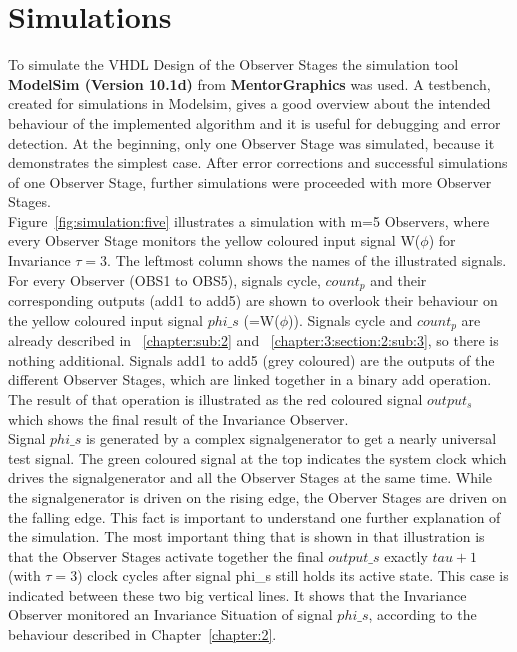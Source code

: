 \section{Simulations}
\label{chapter:4:section:2}
To simulate the VHDL Design of the Observer Stages the simulation tool \textbf{ModelSim (Version 10.1d)} from \textbf{MentorGraphics} was used. 
A testbench, created for simulations in Modelsim, gives a good overview about the intended behaviour of the implemented algorithm and it is useful for debugging and error detection. 
At the beginning, only one Observer Stage was simulated, because it demonstrates the simplest case. 
After error corrections and successful simulations of one Observer Stage, further simulations were proceeded with more Observer Stages. \\
Figure~\ref{fig:simulation:five} illustrates a simulation with m=5 Observers, where every Observer Stage monitors the yellow coloured input signal W($\phi$) for Invariance $\tau=3$. 
The leftmost column shows the names of the illustrated signals. 
For every Observer (OBS1 to OBS5), signals cycle, $count_p$ and their corresponding outputs (add1 to add5) are shown to overlook their behaviour on the yellow coloured input signal $phi\_s$ (=W($\phi$)). 
Signals cycle and $count_p$ are already described in ~\ref{chapter:sub:2} and ~\ref{chapter:3:section:2:sub:3}, so there is nothing additional. 
Signals add1 to add5 (grey coloured) are the outputs of the different Observer Stages, which are linked together in a binary add operation. 
The result of that operation is illustrated as the red coloured signal $output_s$ which shows the final result of the Invariance Observer. \\
Signal $phi\_s$ is generated by a complex signalgenerator to get a nearly universal test signal. The green coloured signal at the top indicates the system clock which drives the signalgenerator 
and all the Observer Stages at the same time. 
While the signalgenerator is driven on the rising edge, the Oberver Stages are driven on the falling edge. 
This fact is important to understand one further explanation of the simulation. 
The most important thing that is shown in that illustration is that the Observer Stages activate together the final $output\_s$ exactly $tau + 1$ (with $\tau = 3$) clock cycles after signal phi\_s still holds its active state. 
This case is indicated between these two big vertical lines. 
It shows that the Invariance Observer monitored an Invariance Situation of signal $phi\_s$, according to the behaviour described in Chapter~\ref{chapter:2}. 
